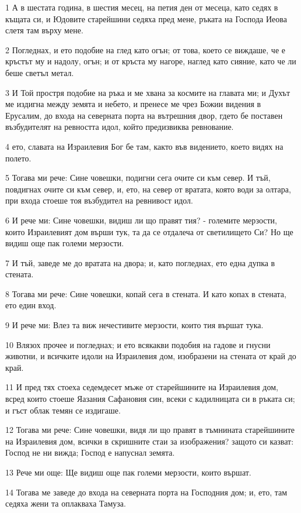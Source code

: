 \par 1 А в шестата година, в шестия месец, на петия ден от месеца, като седях в къщата си, и Юдовите старейшини седяха пред мене, ръката на Господа Иеова слетя там върху мене.
\par 2 Погледнах, и ето подобие на глед като огън; от това, което се виждаше, че е кръстът му и надолу, огън; и от кръста му нагоре, наглед като сияние, като че ли беше светъл метал.
\par 3 И Той простря подобие на ръка и ме хвана за космите на главата ми; и Духът ме издигна между земята и небето, и пренесе ме чрез Божии видения в Ерусалим, до входа на северната порта на вътрешния двор, гдето бе поставен възбудителят на ревността идол, който предизвиква ревнование.
\par 4 ето, славата на Израилевия Бог бе там, както във видението, което видях на полето.
\par 5 Тогава ми рече: Сине човешки, подигни сега очите си към север. И тъй, повдигнах очите си към север, и, ето, на север от вратата, която води за олтара, при входа стоеше тоя възбудител на ревнивост идол.
\par 6 И рече ми: Сине човешки, видиш ли що правят тия? - големите мерзости, които Израилевият дом върши тук, та да се отдалеча от светилището Си? Но ще видиш още пак големи мерзости.
\par 7 И тъй, заведе ме до вратата на двора; и, като погледнах, ето една дупка в стената.
\par 8 Тогава ми рече: Сине човешки, копай сега в стената. И като копах в стената, ето един вход.
\par 9 И рече ми: Влез та виж нечестивите мерзости, които тия вършат тука.
\par 10 Влязох прочее и погледнах; и ето всякакви подобия на гадове и гнусни животни, и всичките идоли на Израилевия дом, изобразени на стената от край до край.
\par 11 И пред тях стоеха седемдесет мъже от старейшините на Израилевия дом, всред които стоеше Яазания Сафановия син, всеки с кадилницата си в ръката си; и гъст облак темян се издигаше.
\par 12 Тогава ми рече: Сине човешки, видя ли що правят в тъмнината старейшините на Израилевия дом, всички в скришните стаи за изображения? защото си казват: Господ не ни вижда; Господ е напуснал земята.
\par 13 Рече ми още: Ще видиш още пак големи мерзости, които вършат.
\par 14 Тогава ме заведе до входа на северната порта на Господния дом; и, ето, там седяха жени та оплакваха Тамуза.
